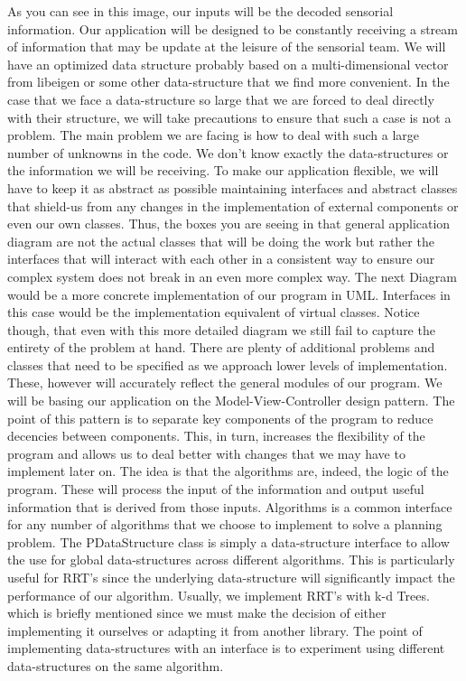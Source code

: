 \documentclass[titlepage]{article}
\begin{document}
As you can see in this image, our inputs will be the decoded sensorial information. Our application will be designed to be constantly receiving a stream of information that may be update at the leisure of the sensorial team. We will have an optimized data structure probably based on a multi-dimensional vector from libeigen or some other data-structure that we find more convenient. 
In the case that we face a data-structure so large that we are forced to deal directly with their structure, we will take precautions to ensure that such a case is not a problem. The main problem we are facing is how to deal with such a large number of unknowns in the code. We don't know exactly the data-structures or the information we will be receiving. To make our application flexible, we will have to keep it as abstract as possible maintaining interfaces and abstract classes that shield-us from any changes in the implementation of external components or even our own classes. Thus, the boxes you are seeing in that general application diagram are not the actual classes that will be doing the work but rather the interfaces that will interact with each other in a consistent way to ensure our complex system does not break in an even more complex way.
The next Diagram would be a more concrete implementation of our program in UML. Interfaces in this case would be the implementation equivalent of virtual classes. Notice though, that even with this more detailed diagram we still fail to capture the entirety of the problem at hand. There are plenty of additional problems and classes that need to be specified as we approach lower levels of implementation. These, however will accurately reflect the general modules of our program.
We will be basing our application on the Model-View-Controller design pattern. The point of this pattern is to separate key components of the program to reduce decencies between components. This, in turn, increases the flexibility of the program and allows us to deal better with changes that we may have to implement later on. The idea is that the algorithms are, indeed, the logic of the program. These will process the input of the information and output useful information that is derived from those inputs. Algorithms is a common interface for any number of algorithms that we choose to implement to solve a planning problem. The PDataStructure class is simply a data-structure interface to allow the use for global data-structures across different algorithms. This is particularly useful for RRT's since the underlying data-structure will significantly impact the performance of our algorithm. Usually, we implement RRT's with k-d Trees. which is briefly mentioned since we must make the decision of either implementing it ourselves or adapting it from another library. The point of implementing data-structures with an interface is to experiment using different data-structures on the same algorithm.
\end{document}

